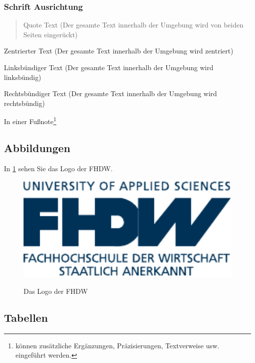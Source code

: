 \subsubsection{Schrift Ausrichtung}
\label{sec:Schrift Ausrichtung}
\begin{quote}
Quote Text (Der gesamte Text innerhalb der Umgebung wird von beiden Seiten eingerückt)
\end{quote}
\begin{center}
Zentrierter Text (Der gesamte Text innerhalb der Umgebung wird zentriert)
\end{center}
\begin{flushleft}
Linksbündiger Text (Der gesamte Text innerhalb der Umgebung wird linksbündig)
\end{flushleft}
\begin{flushright}
Rechtsbündiger Text (Der gesamte Text innerhalb der Umgebung wird rechtsbündig)
\end{flushright}
In einer Fußnote\footnote{können zusätzliche Ergänzungen, Präzisierungen, Textverweise usw. eingeführt werden.}

\subsection{Abbildungen}

In \cref{fig:fhdw} sehen Sie das Logo der FHDW.

\begin{figure}[hbt]
\centering
\begin{minipage}[t]{.7\textwidth} %
\caption{Das Logo der FHDW} %
\includegraphics[width=1\textwidth]{img/fhdw}\\ %
\label{fig:fhdw}
\end{minipage}
\end{figure}

\subsection{Tabellen}

